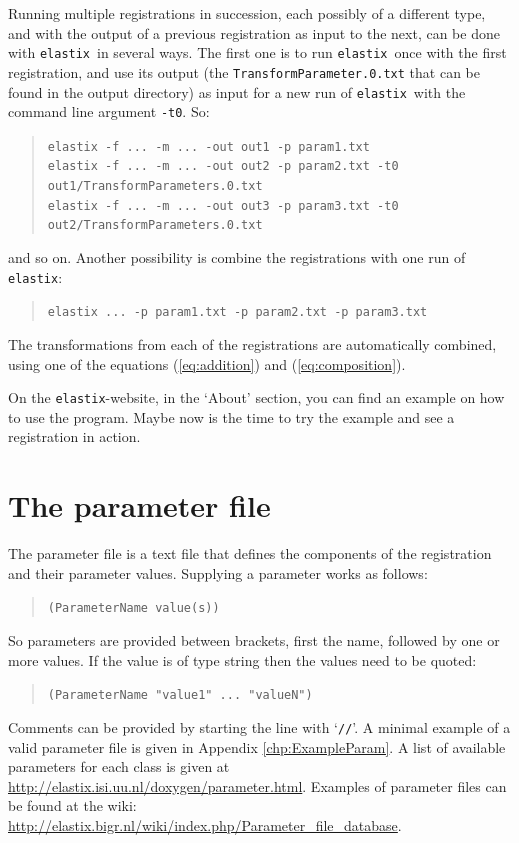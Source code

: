 \documentclass[]{report}
\newcommand{\elastix}{\texttt{elastix}}
\begin{document}
Running multiple registrations in succession, each possibly of a
different type, and with the output of a previous registration as
input to the next, can be done with \elastix\ in several ways. The
first one is to run \elastix\ once with the first registration, and
use its output (the \texttt{TransformParameter.0.txt} that can be
found in the output directory) as input for a new run of \elastix\
with the command line argument \texttt{-t0}. So:
\begin{quote}
\texttt{elastix -f ... -m ... -out out1 -p param1.txt} \\
\texttt{elastix -f ... -m ... -out out2 -p param2.txt -t0
out1/TransformParameters.0.txt} \\
\texttt{elastix -f ... -m ... -out out3 -p param3.txt -t0
out2/TransformParameters.0.txt}
\end{quote}
and so on. Another possibility is combine the registrations with one
run of \elastix:
\begin{quote}
\texttt{elastix ... -p param1.txt -p param2.txt -p param3.txt}
\end{quote}
The transformations from each of the registrations are automatically
combined, using one of the equations (\ref{eq:addition}) and
(\ref{eq:composition}).

On the \elastix-website, in the `About' section, you can find an
example on how to use the program. Maybe now is the time to try
the example and see a registration in action.


\section{The parameter file}\label{sec:elastix:param}

The parameter file is a text file that defines the components of the
registration and their parameter values. Supplying a parameter works
as follows:
\begin{quote}
\texttt{(ParameterName value(s))}
\end{quote}
So parameters are provided between brackets, first the name,
followed by one or more values. If the value is of type string then
the values need to be quoted:
\begin{quote}
\texttt{(ParameterName "value1" ... "valueN")}
\end{quote}
Comments can be provided by starting the line with `\texttt{//}'. A
minimal example of a valid parameter file is given in Appendix
\ref{chp:ExampleParam}. A list of available parameters for each
class is given at
\url{http://elastix.isi.uu.nl/doxygen/parameter.html}. Examples of
parameter files can be found at the wiki:
\url{http://elastix.bigr.nl/wiki/index.php/Parameter_file_database}.
\end{document}
